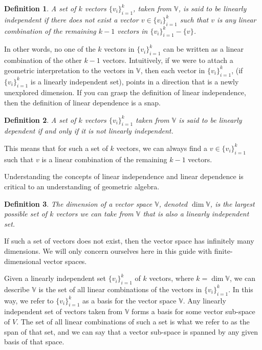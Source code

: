 \documentclass[12pt]{article}
\newcommand{\V}{\mathbb{V}}
\newtheorem{definition}{Definition}[section]
\begin{document}
\begin{definition}
A set of $k$ vectors $\{v_i\}_{i=1}^k$, taken from $\V$, is said to be linearly
independent if there does not exist a vector $v\in\{v_i\}_{i=1}^k$ such that
$v$ is any linear combination of the remaining $k-1$ vectors in $\{v_i\}_{i=1}^k-\{v\}$.
\end{definition}

In other words, no one of the $k$ vectors in $\{v_i\}_{i=1}^k$ can be
written as a linear combination of the other $k-1$ vectors.  Intuitively, if
we were to attach a geometric interpretation to the vectors in $\V$, then
each vector in $\{v_i\}_{i=1}^k$, (if $\{v_i\}_{i=1}^k$ is a linearly independent set), points
in a direction that is a newly unexplored dimension.  If you can grasp the
definition of linear independence, then the definition of linear dependence
is a snap.

\begin{definition}
A set of $k$ vectors $\{v_i\}_{i=1}^k$ taken from $\V$ is said to be linearly
dependent if and only if it is not linearly independent.
\end{definition}

This means that for such a set of $k$ vectors, we can always find a $v\in\{v_i\}_{i=1}^k$
such that $v$ is a linear combination of the remaining $k-1$ vectors.

Understanding the concepts of linear independence and linear dependence is
critical to an understanding of geometric algebra.

\begin{definition}
The dimension of a vector space $\V$, denoted $\dim\V$, is the largest
possible set of $k$ vectors we can take from $\V$ that is also a linearly
independent set.
\end{definition}

If such a set of vectors does not exist, then the vector space has
infinitely many dimensions.  We will only concern ourselves here in this
guide with finite-dimensional vector spaces.

Given a linearly independent set $\{v_i\}_{i=1}^k$ of $k$ vectors, where $k=\dim\V$,
we can describe $\V$ is the set of all linear combinations of the vectors in $\{v_i\}_{i=1}^k$.
In this way, we refer to $\{v_i\}_{i=1}^k$ as a basis for the vector space $\V$.
Any linearly independent set of vectors taken from $\V$ forms a basis for some
vector sub-space of $V$.  The set of all linear combinations of such a set is
what we refer to as the span of that set, and we can say that a vector sub-space
is spanned by any given basis of that space.
\end{document}
